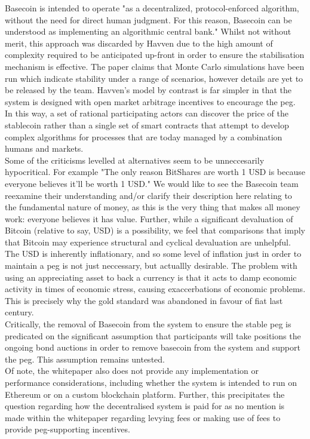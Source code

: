 \noindent Basecoin is intended to operate "as a decentralized, protocol-enforced algorithm, without the need for direct human judgment. For this reason, Basecoin can be understood as implementing an algorithmic central bank." Whilst not without merit, this approach was discarded by Havven due to the high amount of complexity required to be anticipated up-front in order to ensure the stabilisation mechanism is effective. The paper claims that Monte Carlo simulations have been run which indicate stability under a range of scenarios, however details are yet to be released by the team. Havven's model by contrast is far simpler in that the system is designed with open market arbitrage incentives to encourage the peg. In this way, a set of rational participating actors can discover the price of the stablecoin rather than a single set of smart contracts that attempt to develop complex algorithms for processes that are today managed by a combination humans and markets. \\

\noindent Some of the criticisms levelled at alternatives seem to be unneccesarily hypocritical. For example "The only reason BitShares are worth 1 USD is because everyone believes it’ll be worth 1 USD." We would like to see the Basecoin team  reexamine their understanding and/or clarify their description here relating to the fundamental nature of money, as this is the very thing that makes all money work: everyone believes it has value. Further, while a significant devaluation of Bitcoin (relative to say, USD) is a possibility, we feel that comparisons that imply that Bitcoin may experience structural and cyclical devaluation are unhelpful. The USD is inherently inflationary, and so some level of inflation just in order to maintain a peg is not just neccessary, but actuallly desirable. The problem with using an appreciating asset to back a currency is that it acts to damp economic activity in times of economic stress, causing exaccerbations of economic problems. This is precisely why the gold standard was abandoned in favour of fiat last century. \\

\noindent Critically, the removal of Basecoin from the system to ensure the stable peg is predicated on the significant assumption that participants will take positions the ongoing bond auctions in order to remove basecoin from the system and support the peg. This assumption remains untested. \\

\noindent Of note, the whitepaper also does not provide any implementation or performance considerations, including whether the system is intended to run on Ethereum or on a custom blockchain platform. Further, this precipitates the question regarding how the decentralised system is paid for as no mention is made within the whitepaper regarding levying fees or making use of fees to provide peg-supporting incentives. \\



